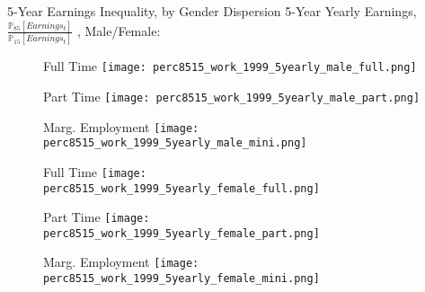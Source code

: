 \documentclass[hyperref={bookmarks=false}]{beamer}
\begin{document}
\begin{appendix}
\begin{frame}{5-Year Earnings Inequality, by Gender}
Dispersion 5-Year Yearly Earnings, $\frac{\mathbb{P}_{85}[Earnings_t]}{\mathbb{P}_{15}[Earnings_t]}$ , Male/Female:
\begin{figure}[!t]
\begin{minipage}[b]{0.32\textwidth}{Full Time}
\centering
\texttt{[image: perc8515\_work\_1999\_5yearly\_male\_full.png]}
\end{minipage}
\begin{minipage}[b]{0.32\textwidth}{Part Time}
\centering
\texttt{[image: perc8515\_work\_1999\_5yearly\_male\_part.png]}
\end{minipage}
\begin{minipage}[b]{0.32\textwidth}{Marg. Employment}
\centering
\texttt{[image: perc8515\_work\_1999\_5yearly\_male\_mini.png]}
\end{minipage}
\begin{minipage}[b]{0.32\textwidth}{Full Time}
\centering
\texttt{[image: perc8515\_work\_1999\_5yearly\_female\_full.png]}
\end{minipage}
\begin{minipage}[b]{0.32\textwidth}{Part Time}
\centering
\texttt{[image: perc8515\_work\_1999\_5yearly\_female\_part.png]}
\end{minipage}
\begin{minipage}[b]{0.32\textwidth}{Marg. Employment}
\centering
\texttt{[image: perc8515\_work\_1999\_5yearly\_female\_mini.png]}
\end{minipage}
\end{figure}
\end{frame}


\end{appendix}
\end{document}
